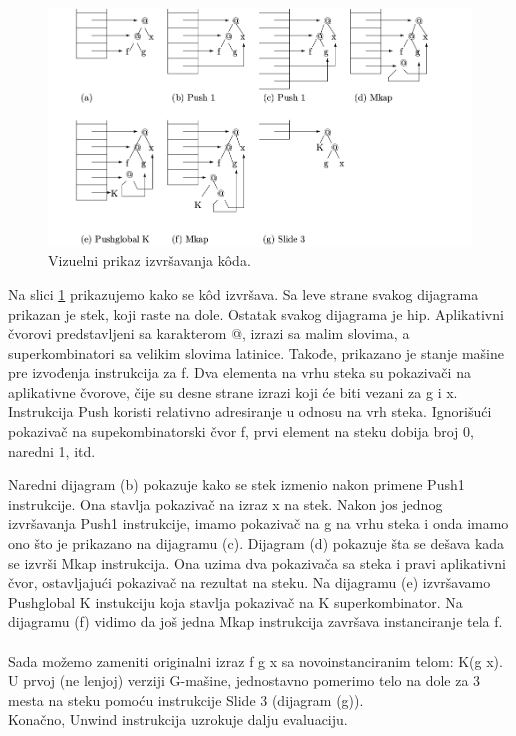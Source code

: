 \begin{figure}[h!]
	\centering
	\includegraphics[scale=0.35]{primerGmasine.png}
	
	\caption{Vizuelni prikaz izvršavanja k\^oda.}
	\label{fig:primerGmasine}
\end{figure}

Na slici \ref{fig:primerGmasine} prikazujemo kako se k\^ od izvršava. Sa leve strane svakog dijagrama prikazan je stek, koji raste na dole. Ostatak svakog dijagrama je hip. Aplikativni čvorovi predstavljeni sa karakterom @, izrazi sa malim slovima, a superkombinatori sa velikim slovima latinice. Takođe, prikazano je stanje mašine pre izvođenja instrukcija za f. Dva elementa na vrhu steka su pokazivači na aplikativne čvorove, čije su desne strane izrazi koji će biti vezani za g i x. Instrukcija Push koristi relativno adresiranje u odnosu na vrh steka. Ignorišući pokazivač na supekombinatorski čvor f, prvi element na steku dobija broj 0, naredni 1, itd.

Naredni dijagram (b) pokazuje kako se stek izmenio nakon primene Push1 instrukcije. Ona stavlja pokazivač na izraz x na stek. Nakon jos jednog izvršavanja Push1 instrukcije, imamo pokazivač na g na vrhu steka i onda imamo ono što je prikazano na dijagramu (c). Dijagram (d) pokazuje šta se dešava kada se izvrši Mkap instrukcija. Ona uzima dva pokazivača sa steka i pravi aplikativni čvor, ostavljajući pokazivač na rezultat na steku. Na dijagramu (e) izvršavamo Pushglobal K instukciju koja stavlja pokazivač na K superkombinator. Na dijagramu (f) vidimo da još jedna Mkap instrukcija završava instanciranje tela f.\\ 
\\
Sada možemo zameniti originalni izraz f g x  sa novoinstanciranim telom: K(g x). U prvoj (ne lenjoj) verziji G-mašine, jednostavno pomerimo telo na dole za 3 mesta na steku pomoću instrukcije Slide 3 (dijagram (g)).\\ Konačno, Unwind instrukcija uzrokuje dalju evaluaciju.



